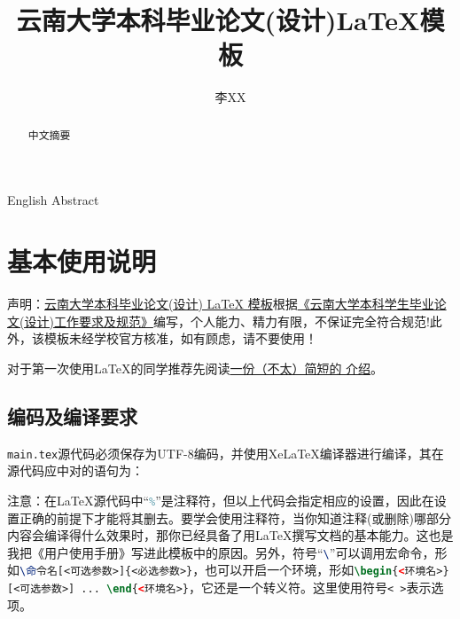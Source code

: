 \documentclass{YNUbachelor}
\title{云南大学本科毕业论文(设计)\;\LaTeX 模板}
\author{李XX}
\begin{document}
	\frontcover

	\copyrightpage

	\begin{abstract}
		中文摘要
	\end{abstract}


	\begin{enabstract}
		English Abstract
	\end{enabstract}
	
		
	\tableofcontents

	\section{基本使用说明}

		声明：\href{https://gitee.com/Astro-Lee/YNU-thesis-bachelor}{云南大学本科毕业论文(设计) LaTeX 模板}根据\href{http://www.jwc.ynu.edu.cn/info/1003/2052.htm}{《云南大学本科学生毕业论文(设计)工作要求及规范》}编写，个人能力、精力有限，不保证完全符合规范!此外，该模板未经学校官方核准，如有顾虑，请不要使用！
		
		对于第一次使用\LaTeX 的同学推荐先阅读\href{http://mirrors.ctan.org/info/lshort/chinese/lshort-zh-cn.pdf}{一份（不太）简短的 \LaTeXe 介绍}。
		
		\subsection{编码及编译要求}
		\lstinline[language=latex]|main.tex|源代码必须保存为UTF-8编码，并使用XeLaTeX编译器进行编译，其在源代码应中对的语句为：
		
	\begin{latexcode}
	\end{latexcode}
		
		注意：在\LaTeX 源代码中``\lstinline[language=latex]|%|''是注释符，但以上代码会指定相应的设置，因此在设置正确的前提下才能将其删去。{\color{red}要学会使用注释符，当你知道注释(或删除)哪部分内容会编译得什么效果时，那你已经具备了用\LaTeX 撰写文档的基本能力。这也是我把《用户使用手册》写进此模板中的原因。}另外，符号``\lstinline[language=latex]|\|''可以调用宏命令，形如\lstinline[language=latex]|\命令名[<可选参数>]{<必选参数>}|，也可以开启一个环境，形如\lstinline[language=latex]|\begin{<环境名>}[<可选参数>] ... \end{<环境名>}|，它还是一个转义符。这里使用符号\lstinline[language=latex]|< >|表示选项。
		
\end{document}

